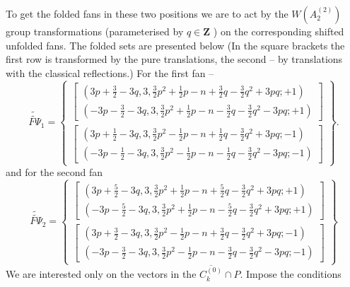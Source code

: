 \documentclass{article}
\begin{document}
To get the folded fans in these two positions we are to act by the $W\left(
A_{2}^{\left( 2\right) }\right) $ group transformations (parameterised by $%
q\in \mathbf{Z}$ ) on the corresponding shifted unfolded fans. The folded
sets are presented below (In the square brackets the first row is
transformed by the pure translations, the second -- by translations with the
classical reflections.) For the first fan --
\begin{equation*}
\widetilde{\widetilde{F\Psi }}_{1}=\left\{
\begin{array}{c}
\left[
\begin{array}{c}
\left( 3p+\frac{3}{2}-3q,3,\frac{3}{2}p^{2}+\frac{1}{2}p-n+\frac{3}{2}q-%
\frac{3}{2}q^{2}+3pq;+1\right) \\
\left( -3p-\frac{3}{2}-3q,3,\frac{3}{2}p^{2}+\frac{1}{2}p-n-\frac{3}{2}q-%
\frac{3}{2}q^{2}-3pq;+1\right)
\end{array}
\right] \\
\left[
\begin{array}{c}
\left( 3p+\frac{1}{2}-3q,3,\frac{3}{2}p^{2}-\frac{1}{2}p-n+\frac{1}{2}q-%
\frac{3}{2}q^{2}+3pq;-1\right) \\
\left( -3p-\frac{1}{2}-3q,3,\frac{3}{2}p^{2}-\frac{1}{2}p-n-\frac{1}{2}q-%
\frac{3}{2}q^{2}-3pq;-1\right)
\end{array}
\right]
\end{array}
\right\} .
\end{equation*}
and for the second fan
\begin{equation*}
\widetilde{\widetilde{F\Psi }}_{2}=\left\{
\begin{array}{c}
\left[
\begin{array}{c}
\left( 3p+\frac{5}{2}-3q,3,\frac{3}{2}p^{2}+\frac{1}{2}p-n+\frac{5}{2}q-%
\frac{3}{2}q^{2}+3pq;+1\right) \\
\left( -3p-\frac{5}{2}-3q,3,\frac{3}{2}p^{2}+\frac{1}{2}p-n-\frac{5}{2}q-%
\frac{3}{2}q^{2}+3pq;+1\right)
\end{array}
\right] \\
\left[
\begin{array}{c}
\left( 3p+\frac{3}{2}-3q,3,\frac{3}{2}p^{2}-\frac{1}{2}p-n+\frac{3}{2}q-%
\frac{3}{2}q^{2}+3pq;-1\right) \\
\left( -3p-\frac{3}{2}-3q,3,\frac{3}{2}p^{2}-\frac{1}{2}p-n-\frac{3}{2}q-%
\frac{3}{2}q^{2}-3pq;-1\right)
\end{array}
\right]
\end{array}
\right\}
\end{equation*}
We are interested only on the vectors in the $\overline{C_{k}^{\left(
0\right) }}\cap P.$ Impose the conditions
\end{document}
